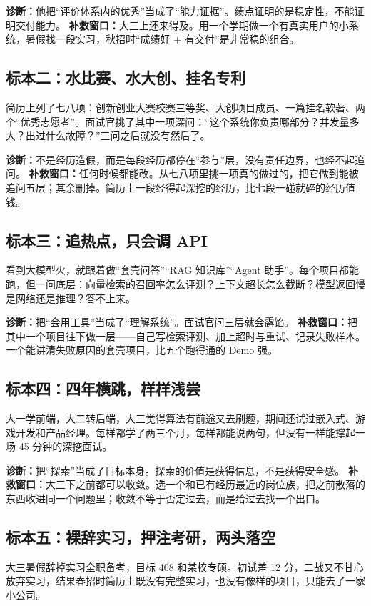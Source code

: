 \documentclass[UTF8,zihao=5,openany]{ctexbook}
\begin{document}
\textbf{诊断：}他把“评价体系内的优秀”当成了“能力证据”。绩点证明的是稳定性，不能证明交付能力。
\textbf{补救窗口：}大三上还来得及。用一个学期做一个有真实用户的小系统，暑假找一段实习，秋招时“成绩好 + 有交付”是非常稳的组合。

\subsection{标本二：水比赛、水大创、挂名专利}
简历上列了七八项：创新创业大赛校赛三等奖、大创项目成员、一篇挂名软著、两个“优秀志愿者”。面试官挑了其中一项深问：“这个系统你负责哪部分？并发量多大？出过什么故障？”三问之后就没有然后了。

\textbf{诊断：}不是经历造假，而是每段经历都停在“参与”层，没有责任边界，也经不起追问。
\textbf{补救窗口：}任何时候都能改。从七八项里挑一项真的做过的，把它做到能被追问五层；其余删掉。简历上一段经得起深挖的经历，比七段一碰就碎的经历值钱。

\subsection{标本三：追热点，只会调 API}
看到大模型火，就跟着做“套壳问答”“RAG 知识库”“Agent 助手”。每个项目都能跑，但一问底层：向量检索的召回率怎么评测？上下文超长怎么截断？模型返回慢是网络还是推理？答不上来。

\textbf{诊断：}把“会用工具”当成了“理解系统”。面试官问三层就会露馅。
\textbf{补救窗口：}把其中一个项目往下做一层——自己写检索评测、加上超时与重试、记录失败样本。一个能讲清失败原因的套壳项目，比五个跑得通的 Demo 强。

\subsection{标本四：四年横跳，样样浅尝}
大一学前端，大二转后端，大三觉得算法有前途又去刷题，期间还试过嵌入式、游戏开发和产品经理。每样都学了两三个月，每样都能说两句，但没有一样能撑起一场 45 分钟的深挖面试。

\textbf{诊断：}把“探索”当成了目标本身。探索的价值是获得信息，不是获得安全感。
\textbf{补救窗口：}大三下之前都可以收敛。选一个和已有经历最近的岗位族，把之前散落的东西收进同一个问题里；收敛不等于否定过去，而是给过去找一个出口。

\subsection{标本五：裸辞实习，押注考研，两头落空}
大三暑假辞掉实习全职备考，目标 408 和某校专硕。初试差 12 分，二战又不甘心放弃实习，结果春招时简历上既没有完整实习，也没有像样的项目，只能去了一家小公司。
\end{document}
